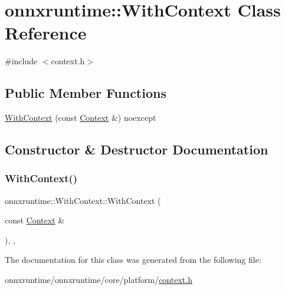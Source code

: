 \hypertarget{classonnxruntime_1_1WithContext}{}\section{onnxruntime\+:\+:With\+Context Class Reference}
\label{classonnxruntime_1_1WithContext}


{\ttfamily \#include $<$context.\+h$>$}

\subsection*{Public Member Functions}
\begin{DoxyCompactItemize}
\item 
\mbox{\hyperlink{classonnxruntime_1_1WithContext_a6a526e69516aa1384807a5c27f239198}{With\+Context}} (const \mbox{\hyperlink{classonnxruntime_1_1Context}{Context}} \&) noexcept
\end{DoxyCompactItemize}


\subsection{Constructor \& Destructor Documentation}
\mbox{\label{classonnxruntime_1_1WithContext_a6a526e69516aa1384807a5c27f239198}} 
\subsubsection{\texorpdfstring{With\+Context()}{WithContext()}}
{\footnotesize\ttfamily onnxruntime\+::\+With\+Context\+::\+With\+Context (\begin{DoxyParamCaption}\item[{const \mbox{\hyperlink{classonnxruntime_1_1Context}{Context}} \&}]{ }\end{DoxyParamCaption})\hspace{0.3cm}{\ttfamily [inline]}, {\ttfamily [explicit]}, {\ttfamily [noexcept]}}



The documentation for this class was generated from the following file\+:\begin{DoxyCompactItemize}
\item 
onnxruntime/onnxruntime/core/platform/\mbox{\hyperlink{context_8h}{context.\+h}}\end{DoxyCompactItemize}
